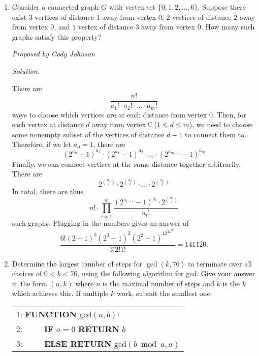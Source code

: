 \documentclass[10pt]{article}
\newcommand{\proposed}[1]
{
\vspace{3pt}
\noindent\textit{Proposed by #1}
}
\newcommand{\solution}
{
\vspace{3pt}
\noindent\textit{Solution.}\qquad
}
\begin{document}
\begin{enumerate}

\item Consider a connected graph $G$ with vertex set $\{0,1,2,...,6\}$. Suppose there exist $3$ vertices of distance $1$ away from vertex $0$, $2$ vertices of distance $2$ away from vertex $0$, and $1$ vertex of distance $3$ away from vertex $0$. How many such graphs satisfy this property?

\proposed{Cody Johnson}

\solution
There are \[\frac{n!}{a_1!\cdot a_2!\cdot...\cdot a_m!}\] ways to choose which vertices are at each distance from vertex $0$. Then, for each vertex at distance $d$ away from vertex $0$ ($1\le d\le m$), we need to choose some nonempty subset of the vertices of distance $d-1$ to connect them to. Therefore, if we let $a_0=1$, there are \[(2^{a_0}-1)^{a_1}\cdot(2^{a_1}-1)^{a_2}\cdot...\cdot(2^{a_{m-1}}-1)^{a_m}\] Finally, we can connect vertices at the same distance together arbitrarily. There are \[2^{\binom{a_1}2}\cdot2^{\binom{a_2}2}\cdot...\cdot2^{\binom{a_m}2}\] In total, there are thus \[n!\cdot\prod_{i=1}^m\frac{(2^{a_{i-1}}-1)^{a_i}\cdot2^{\binom{a_i}2}}{a_i!}\] such graphs. Plugging in the numbers gives an answer of 
\[\dfrac{6!(2-1)^3(2^3-1)^2(2^2-1)^12^32^12^0}{3!2!1!}=\boxed{141120}.\]





\item Determine the largest number of steps for $\gcd(k,76)$ to terminate over all choices of $0 < k < 76$, using the following algorithm for gcd. Give your answer in the form $(n,k)$ where $n$ is the maximal number of steps and $k$ is the $k$ which achieves this. If multiple $k$ work, submit the smallest one.

\begin{tabular}{l}
1: \textbf{FUNCTION} $\text{gcd}(a,b)$: \\
2: $\qquad$ \textbf{IF} $a = 0$ \textbf{RETURN} $b$ \\ 
3: $\qquad$ \textbf{ELSE RETURN} $\text{gcd}(b \bmod a,a)$
\end{tabular}


\end{enumerate}
\end{document}
